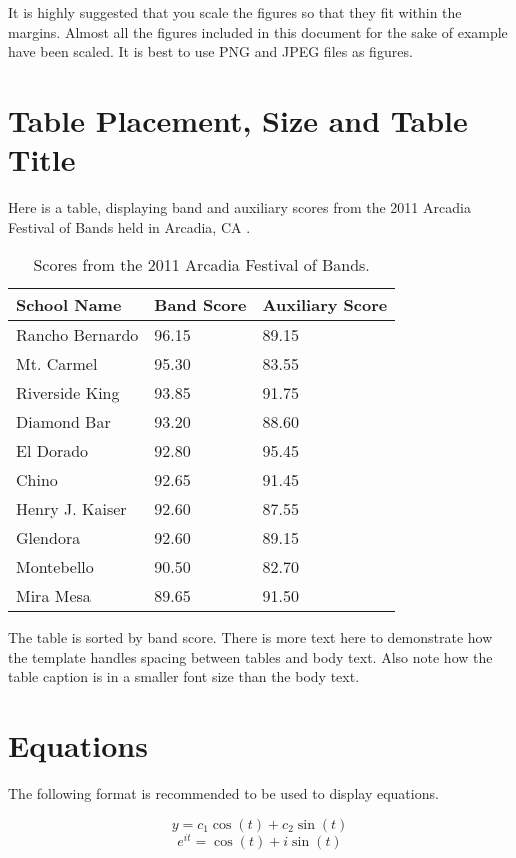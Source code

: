 It is highly suggested that you scale the figures so that they fit within the margins. Almost all the figures included in this document for the sake of example have been scaled. It is best to use PNG and JPEG files as figures.

\section{Table Placement, Size and Table Title}

Here is a table, displaying band and auxiliary scores from the 2011 Arcadia Festival of Bands held in Arcadia, CA \cite{ARCADIA}.

\begin{table}[h!]
	\centering

	\label{Band}
	\begin{tabular}{|l|l|l|}
		\hline
		School Name & Band Score & Auxiliary Score \\ \hline
		Rancho Bernardo & 96.15 & 89.15 \\ \hline
		Mt. Carmel & 95.30 & 83.55 \\ \hline
		Riverside King & 93.85 & 91.75 \\ \hline
		Diamond Bar & 93.20 & 88.60 \\ \hline
		El Dorado & 92.80 & 95.45 \\ \hline
		Chino & 92.65 & 91.45 \\ \hline
		Henry J. Kaiser & 92.60 & 87.55 \\ \hline
		Glendora & 92.60 & 89.15 \\ \hline
		Montebello & 90.50 & 82.70 \\ \hline
		Mira Mesa & 89.65 & 91.50 \\ \hline
	\end{tabular}
	\caption{Scores from the 2011 Arcadia Festival of Bands.}
\end{table}

The table is sorted by band score. There is more text here to demonstrate how the template handles spacing between tables and body text. Also note how the table caption is in a smaller font size than the body text.

\section{Equations}

The following format is recommended to be used to display equations.

\begin{equation} \label{Equ.2.1}
y=c_1\cos(t)+c_2\sin(t)
\end{equation}
\begin{equation} \label{Equ.2.2}
e^{it}=\cos(t)+i\sin(t)
\end{equation}

